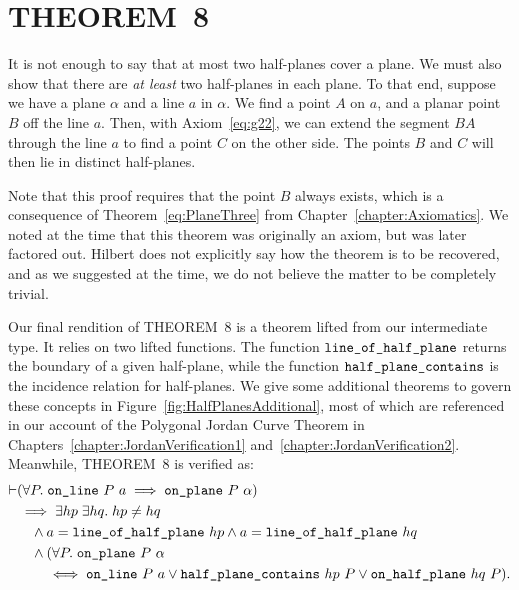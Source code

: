 \section{THEOREM~8}
It is not enough to say that at most two half-planes cover a plane. We must also show that there are \emph{at least} two half-planes in each plane. To that end, suppose we have a plane $\alpha$ and a line $a$ in $\alpha$. We find a  point $A$ on $a$, and a planar point $B$ off the line $a$. Then, with Axiom~\ref{eq:g22}, we can extend the segment $BA$ through the line $a$ to find a point $C$ on the other side. The points $B$ and $C$ will then lie in distinct half-planes. 

Note that this proof requires that the point $B$ always exists, which is a consequence of Theorem~\ref{eq:PlaneThree} from Chapter~\ref{chapter:Axiomatics}. We noted at the time that this theorem was originally an axiom, but was later factored out. Hilbert does not explicitly say how the theorem is to be recovered, and as we suggested at the time, we do not believe the matter to be completely trivial.

Our final rendition of THEOREM~8 is a theorem lifted from our intermediate type. It relies on two lifted functions. The function $\texttt{line\_of\_half\_plane}$ returns the boundary of a given half-plane, while the function $\texttt{half\_plane\_contains}$ is the incidence relation for half-planes. We give some additional theorems to govern these concepts in Figure~\ref{fig:HalfPlanesAdditional}, most of which are referenced in our  account of the Polygonal Jordan Curve Theorem in Chapters~\ref{chapter:JordanVerification1} and~\ref{chapter:JordanVerification2}. Meanwhile, THEOREM~8 is verified as:
\begin{equation}\label{eq:HalfPlaneCover}
  \begin{split}
    \vdash&(\forall P.\;\texttt{on\_line}\ P\ a \implies \texttt{on\_plane}\ P\ \alpha)\\
    &\implies \exists hp\;\exists hq.\; hp \neq hq\\
    &\quad \wedge a = \texttt{line\_of\_half\_plane}\ hp \wedge a = \texttt{line\_of\_half\_plane}\ hq\\
    &\quad \wedge (\forall P.\;\texttt{on\_plane}\ P\ \alpha\\
    &\quad\quad \iff \texttt{on\_line}\ P\ a \vee \texttt{half\_plane\_contains}\ hp\ P \vee \texttt{on\_half\_plane}\ hq\ P).
  \end{split}
\end{equation}

